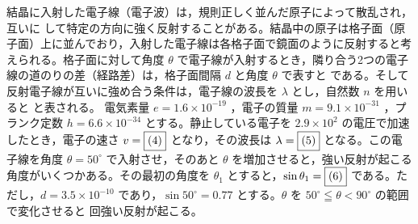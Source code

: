\item
    \begin{mawarikomi}{180pt}{
        
    }
結晶に入射した電子線（電子波）は，規則正しく並んだ原子によって散乱され，互いに  して特定の方向に強く反射することがある。結晶中の原子は格子面（原子面）上に並んでおり，入射した電子線は各格子面で鏡面のように反射すると考えられる。格子面に対して角度 $\theta$ で電子線が入射するとき，隣り合う2つの電子線の道のりの差（経路差）は，格子面間隔 $d$ と角度 $\theta$ で表すと  である。そして反射電子線が互いに強め合う条件は，電子線の波長を $\lambda$ とし，自然数 $n$ を用いると  と表される。
電気素量 $e = 1.6 \times 10^{-19}$ ，電子の質量 $m = 9.1 \times 10^{-31}$ ，プランク定数 $h = 6.6 \times 10^{-34}$  とする。静止している電子を $2.9 \times 10^2$  の電圧で加速したとき，電子の速さ $v = \fbox{(4)}$  となり，その波長は $\lambda = \fbox{(5)}$  となる。この電子線を角度 $\theta = 50^\circ$ で入射させ，そのあと $\theta$ を増加させると，強い反射が起こる角度がいくつかある。その最初の角度を $\theta_1$ とすると，$\sin\theta_1 = \fbox{(6)}$ である。ただし，$d = 3.5 \times 10^{-10}$  であり，$\sin 50^\circ = 0.77$ とする。$\theta$ を $50^\circ \leqq \theta < 90^\circ$ の範囲で変化させると  回強い反射が起こる。
\end{mawarikomi}
